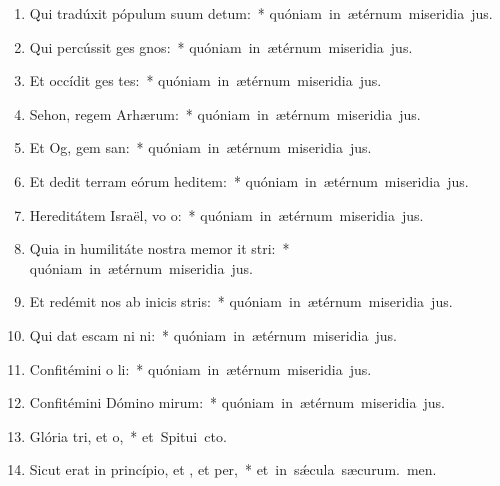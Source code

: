 \begin{flushleft}
\begin{enumerate}[leftmargin=*]
\item Qui tradúxit pópulum suum  detum:~* \mbox{quóniam in ætérnum miseridia jus.}
\item Qui percússit ges gnos:~* \mbox{quóniam in ætérnum miseridia jus.}
\item Et occídit ges tes:~* \mbox{quóniam in ætérnum miseridia jus.}
\item Sehon, regem Arhærum:~* \mbox{quóniam in ætérnum miseridia jus.}
\item Et Og, gem san:~* \mbox{quóniam in ætérnum miseridia jus.}
\item Et dedit terram eórum heditem:~* \mbox{quóniam in ætérnum miseridia jus.}
\item Hereditátem Israël, vo o:~* \mbox{quóniam in ætérnum miseridia jus.}
\item Quia in humilitáte nostra memor it stri:~* \mbox{quóniam in ætérnum miseridia jus.}
\item Et redémit nos ab inicis stris:~* \mbox{quóniam in ætérnum miseridia jus.}
\item Qui dat escam ni ni:~* \mbox{quóniam in ætérnum miseridia jus.}
\item Confitémini o li:~* \mbox{quóniam in ætérnum miseridia jus.}
\item Confitémini Dómino mirum:~* \mbox{quóniam in ætérnum miseridia jus.}
\item Glória tri, et o,~* \mbox{et Spitui cto.}
\item Sicut erat in princípio, et , et per,~* \mbox{et in s\'{\ae}cula sæcurum. men.}


\end{enumerate}
\end{flushleft}

